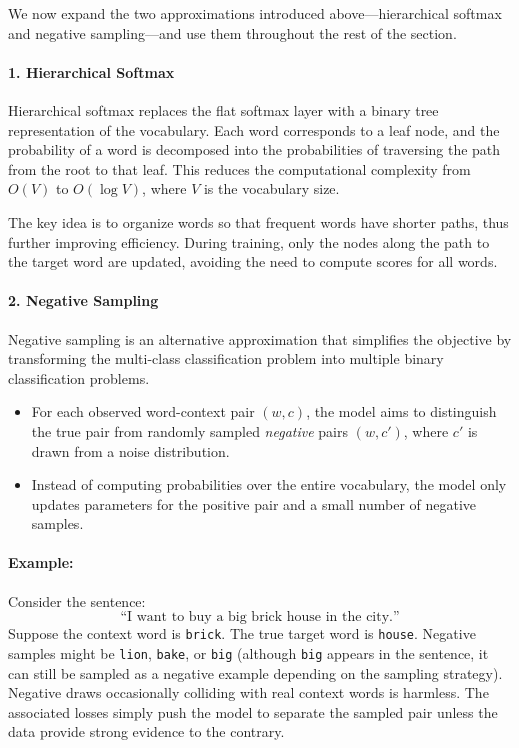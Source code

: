 We now expand the two approximations introduced above---hierarchical softmax and negative sampling---and use them throughout the rest of the section.

\paragraph{1. Hierarchical Softmax}
Hierarchical softmax replaces the flat softmax layer with a binary tree representation of the vocabulary. Each word corresponds to a leaf node, and the probability of a word is decomposed into the probabilities of traversing the path from the root to that leaf. This reduces the computational complexity from \(O(V)\) to \(O(\log V)\), where \(V\) is the vocabulary size.

The key idea is to organize words so that frequent words have shorter paths, thus further improving efficiency. During training, only the nodes along the path to the target word are updated, avoiding the need to compute scores for all words.

\paragraph{2. Negative Sampling}
Negative sampling is an alternative approximation that simplifies the objective by transforming the multi-class classification problem into multiple binary classification problems.

\begin{itemize}
    \item For each observed word-context pair \((w, c)\), the model aims to distinguish the true pair from randomly sampled \emph{negative} pairs \((w, c')\), where \(c'\) is drawn from a noise distribution.
    \item Instead of computing probabilities over the entire vocabulary, the model only updates parameters for the positive pair and a small number of negative samples.
\end{itemize}

\paragraph{Example:} Consider the sentence:
\[
\text{``I want to buy a big brick house in the city.''}
\]
Suppose the context word is \texttt{brick}. The true target word is \texttt{house}. Negative samples might be \texttt{lion}, \texttt{bake}, or \texttt{big} (although \texttt{big} appears in the sentence, it can still be sampled as a negative example depending on the sampling strategy).
\noindent Negative draws occasionally colliding with real context words is harmless. The associated losses simply push the model to separate the sampled pair unless the data provide strong evidence to the contrary.

